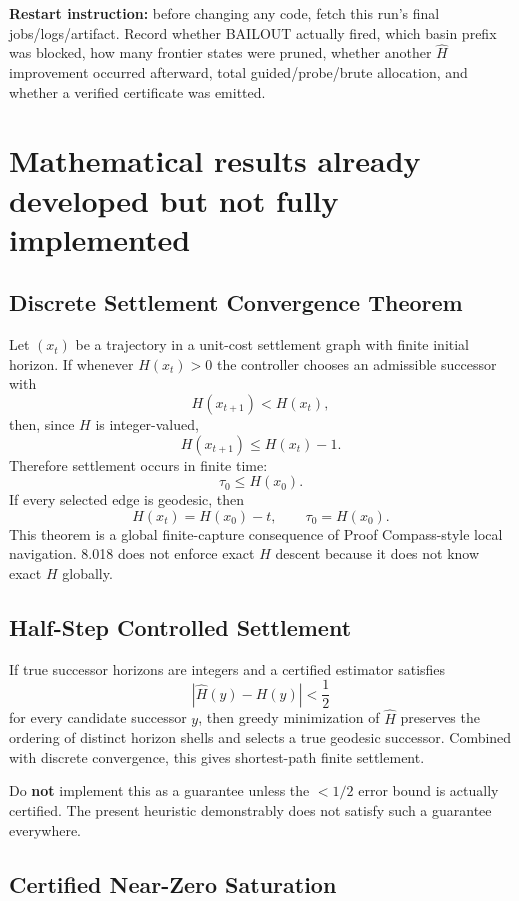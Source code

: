 \documentclass[11pt]{article}
\begin{document}
\textbf{Restart instruction:} before changing any code, fetch this run's final jobs/logs/artifact. Record whether BAILOUT actually fired, which basin prefix was blocked, how many frontier states were pruned, whether another $\widehat H$ improvement occurred afterward, total guided/probe/brute allocation, and whether a verified certificate was emitted.

\section{Mathematical results already developed but not fully implemented}

\subsection{Discrete Settlement Convergence Theorem}

Let $(x_t)$ be a trajectory in a unit-cost settlement graph with finite initial horizon. If whenever $H(x_t)>0$ the controller chooses an admissible successor with
\[
H(x_{t+1})<H(x_t),
\]
then, since $H$ is integer-valued,
\[
H(x_{t+1})\le H(x_t)-1.
\]
Therefore settlement occurs in finite time:
\[
\boxed{\tau_0\le H(x_0).}
\]
If every selected edge is geodesic, then
\[
\boxed{H(x_t)=H(x_0)-t,\qquad \tau_0=H(x_0).}
\]
This theorem is a global finite-capture consequence of Proof Compass-style local navigation. 8.018 does not enforce exact $H$ descent because it does not know exact $H$ globally.

\subsection{Half-Step Controlled Settlement}

If true successor horizons are integers and a certified estimator satisfies
\[
|\widehat H(y)-H(y)|<\frac12
\]
for every candidate successor $y$, then greedy minimization of $\widehat H$ preserves the ordering of distinct horizon shells and selects a true geodesic successor. Combined with discrete convergence, this gives shortest-path finite settlement.

Do \textbf{not} implement this as a guarantee unless the $<1/2$ error bound is actually certified. The present heuristic demonstrably does not satisfy such a guarantee everywhere.

\subsection{Certified Near-Zero Saturation}
\end{document}
